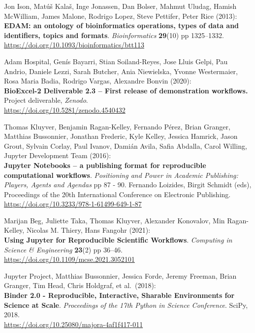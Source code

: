 \begin{thebibliography}{9}
 Jon Ison, Matúš Kalaš, Inge Jonassen, Dan Bolser, Mahmut
Uludag, Hamish McWilliam, James Malone, Rodrigo Lopez, Steve Pettifer,
Peter Rice (2013):\\
\textbf{EDAM: an ontology of bioinformatics operations, types of data
and identifiers, topics and formats}. \emph{Bioinformatics}
\textbf{29}(10) pp 1325--1332.\\
\url{https://doi.org/10.1093/bioinformatics/btt113}

 Adam Hospital, Genís Bayarri, Stian Soiland-Reyes, Jose Lluis
Gelpi, Pau Andrio, Daniele Lezzi, Sarah Butcher, Ania Niewielska, Yvonne
Westermaier, Rosa Maria Badia, Rodrigo Vargas, Alexandre Bonvin
(2020):\\
\textbf{BioExcel-2 Deliverable 2.3 -- First release of demonstration
workflows.} Project deliverable, \emph{Zenodo}.\\
\url{https://doi.org/10.5281/zenodo.4540432}

 Thomas Kluyver, Benjamin Ragan-Kelley, Fernando Pérez, Brian
Granger, Matthias Bussonnier, Jonathan Frederic, Kyle Kelley, Jessica
Hamrick, Jason Grout, Sylvain Corlay, Paul Ivanov, Damián Avila, Safia
Abdalla, Carol Willing, Jupyter Development Team (2016):\\
\textbf{Jupyter Notebooks -- a publishing format for reproducible
computational workflows}. \emph{Positioning and Power in Academic
Publishing: Players, Agents and Agendas} pp 87 - 90. Fernando Loizides,
Birgit Schmidt (eds), Proceedings of the 20th International Conference
on Electronic Publishing.\\
\url{https://doi.org/10.3233/978-1-61499-649-1-87}

 Marijan Beg, Juliette Taka, Thomas Kluyver, Alexander
Konovalov, Min Ragan-Kelley, Nicolas M. Thiery, Hans Fangohr (2021):\\
\textbf{Using Jupyter for Reproducible Scientific Workflows}.
\emph{Computing in Science \& Engineering} \textbf{23}(2) pp 36--46.\\
\url{https://doi.org/10.1109/mcse.2021.3052101}

 Jupyter Project, Matthias Bussonnier, Jessica Forde, Jeremy
Freeman, Brian Granger, Tim Head, Chris Holdgraf, et al.~(2018):\\
\textbf{Binder 2.0 - Reproducible, Interactive, Sharable Environments
for Science at Scale}. \emph{Proceedings of the 17th Python in Science
Conference}. SciPy, 2018.\\
\url{https://doi.org/10.25080/majora-4af1f417-011}


\end{thebibliography}
